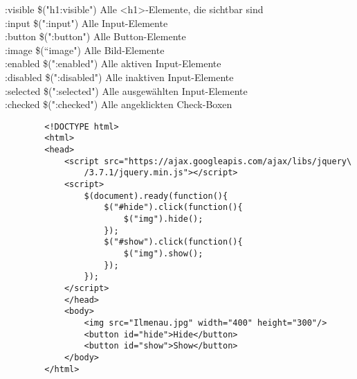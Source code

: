 \documentclass[10pt]{article}
\begin{document}
\begin{tcolorbox}[
    colback=Red!5!white,
    colframe=Red!75!black,
    title={\centering Selektorenzusätze}]
        :visible  \$("h1:visible")  Alle \textless h1\textgreater -Elemente, die sichtbar sind \\
        :input  \$(":input")  Alle Input-Elemente \\
        :button  \$(":button")  Alle Button-Elemente \\
        :image  \$(“image")  Alle Bild-Elemente \\
        :enabled  \$(":enabled")  Alle aktiven Input-Elemente \\
        :disabled  \$(":disabled")  Alle inaktiven Input-Elemente \\
        :selected  \$(":selected")  Alle ausgewählten Input-Elemente \\
        :checked  \$(":checked")  Alle angeklickten Check-Boxen
    \end{tcolorbox}

    \begin{tcolorbox}[
    colback=Red!5!white,
    colframe=Red!75!black,
    title={\centering Beispiel}]
    \begin{lstlisting}
        <!DOCTYPE html>
        <html> 
        <head> 
            <script src="https://ajax.googleapis.com/ajax/libs/jquery\
                /3.7.1/jquery.min.js"></script>
            <script>
                $(document).ready(function(){
                    $("#hide").click(function(){
                        $("img").hide();
                    });
                    $("#show").click(function(){
                        $("img").show();
                    });
                });
            </script>
            </head>
            <body>
                <img src="Ilmenau.jpg" width="400" height="300"/>
                <button id="hide">Hide</button>
                <button id="show">Show</button>
            </body>
        </html>
    \end{lstlisting}
    \end{tcolorbox}
\end{document}
